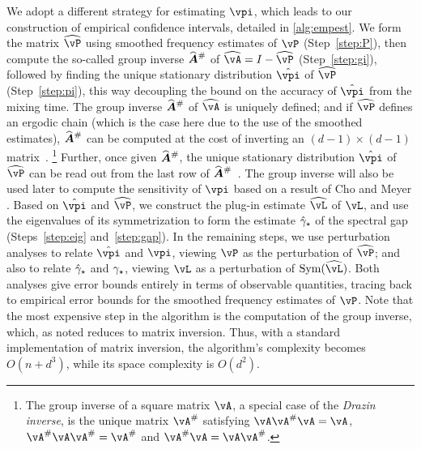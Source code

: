 We adopt a different strategy for estimating $\vpi$, which leads to
our construction of empirical confidence intervals, detailed in
\cref{alg:empest}.
We form the matrix $\wh\vP$ using smoothed frequency estimates of
$\vP$ (Step~\ref{step:P}), then compute the so-called group inverse
$\giAh$ of $\wh\vA = I - \wh\vP$ (Step~\ref{step:gi}), followed by
finding the unique stationary distribution $\hat\vpi$ of $\wh\vP$
(Step~\ref{step:pi}), this way decoupling the bound on the accuracy of $\hat\vpi$
from the mixing time.
The group inverse $\giAh$ of $\wh\vA$ is uniquely defined;
 and if
$\wh\vP$ defines an ergodic chain (which is the case here due to the
use of the smoothed estimates), $\giAh$ can be computed at the cost of
inverting an $(d-1)\times (d-1)$ matrix~\citep[Theorem
5.2]{meyer1975role}.%
\footnote{
\label{ftnote:group-inverse}
The group inverse of a square matrix $\vA$, a special case of the {\em Drazin inverse},
is the unique matrix $\vA^\#$ satisfying
$ \vA\vA^\#\vA = \vA$,
$\vA^\#\vA\vA^\# = \vA^\#$ and
$\vA^\#\vA = \vA\vA^\#$.
}
Further, once given $\giAh$, the unique stationary distribution
$\hat\vpi$ of $\wh\vP$ can be read out from the last row of
$\giAh$~\citep[Theorem 5.3]{meyer1975role}.
The group inverse will also be used later to compute the sensitivity
of $\vpi$ based on a result of Cho and Meyer \cite{cho2001comparison}.
Based on $\hat\vpi$ and $\wh\vP$, we construct the plug-in estimate
$\wh\vL$ of $\vL$, and use the eigenvalues of its symmetrization to
form the estimate $\hat\gamma_{\star}$ of the spectral gap (Steps~\ref{step:eig}
and~\ref{step:gap}).
In the remaining steps, 
we use perturbation analyses to relate $\hat\vpi$ and $\vpi$, viewing
$\vP$ as the perturbation of $\wh\vP$; and also to relate $\hat\gamma_{\star}$
and $\gamma_{\star}$, viewing $\vL$ as a perturbation of $\Sym(\wh\vL)$.
Both analyses give error bounds entirely in terms of observable
quantities, tracing back to empirical error bounds for the smoothed
frequency estimates of $\vP$.
Note that the most expensive step in the algorithm is the computation of the group inverse,
which, as noted reduces to matrix inversion.
Thus, with a standard implementation of matrix inversion, the algorithm's complexity becomes 
$O( n + d^3)$, while its space complexity is $O(d^2)$.

